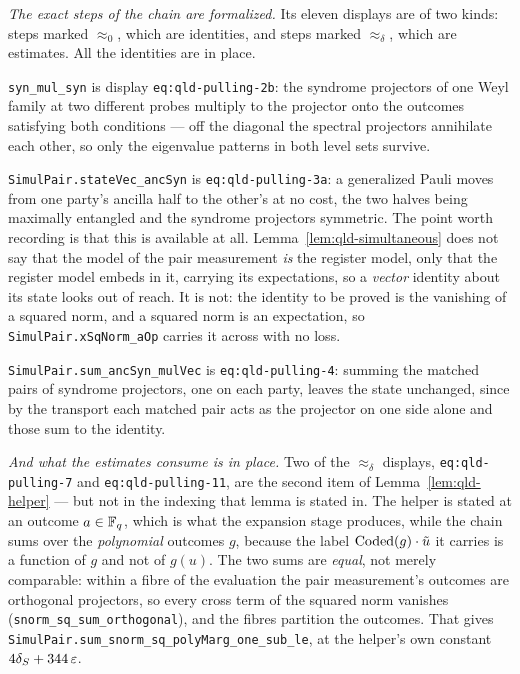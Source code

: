 \emph{The exact steps of the chain are formalized.} Its eleven displays are of two kinds: steps
marked $\approx_0$, which are identities, and steps marked $\approx_\delta$, which are estimates.
All the identities are in place.

\texttt{syn\_mul\_syn} is display \texttt{eq:qld-pulling-2b}: the syndrome projectors of one Weyl
family at two different probes multiply to the projector onto the outcomes satisfying both
conditions --- off the diagonal the spectral projectors annihilate each other, so only the
eigenvalue patterns in both level sets survive.

\texttt{SimulPair.stateVec\_ancSyn} is \texttt{eq:qld-pulling-3a}: a generalized Pauli moves from
one party's ancilla half to the other's at no cost, the two halves being maximally entangled and
the syndrome projectors symmetric. The point worth recording is that this is available at all.
Lemma~\ref{lem:qld-simultaneous} does not say that the model of the pair measurement \emph{is} the
register model, only that the register model embeds in it, carrying its expectations, so a
\emph{vector} identity about its state looks out of reach. It is not: the identity to be proved is
the vanishing of a squared norm, and a squared norm is an expectation, so
\texttt{SimulPair.xSqNorm\_aOp} carries it across with no loss.

\texttt{SimulPair.sum\_ancSyn\_mulVec} is \texttt{eq:qld-pulling-4}: summing the matched pairs of
syndrome projectors, one on each party, leaves the state unchanged, since by the transport each
matched pair acts as the projector on one side alone and those sum to the identity.

\emph{And what the estimates consume is in place.} Two of the $\approx_\delta$ displays,
\texttt{eq:qld-pulling-7} and \texttt{eq:qld-pulling-11}, are the second item of
Lemma~\ref{lem:qld-helper} --- but not in the indexing that lemma is stated in. The helper is
stated at an outcome $a \in \mathbb{F}_q$, which is what the expansion stage produces, while the chain
sums over the \emph{polynomial} outcomes $g$, because the label $\mathrm{Coded}(g) \cdot \tilde{u}$ it
carries is a function of $g$ and not of $g(u)$. The two sums are \emph{equal}, not merely
comparable: within a fibre of the evaluation the pair measurement's outcomes are orthogonal
projectors, so every cross term of the squared norm vanishes
(\texttt{snorm\_sq\_sum\_orthogonal}), and the fibres partition the outcomes. That gives
\texttt{SimulPair.sum\_snorm\_sq\_polyMarg\_one\_sub\_le}, at the helper's own constant
$4\delta_S + 344\,\varepsilon$.

